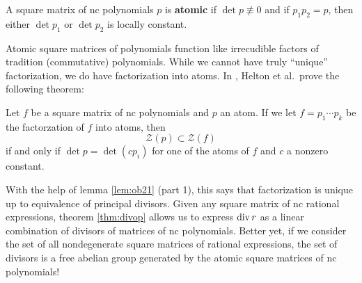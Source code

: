 \begin{definition}[Atomic]%
\label{def:atomic}
  A square matrix of nc polynomials \(p\) is \textbf{atomic} if
  \(\det p \not\equiv 0\) and if \(p_1p_2=p\), then either \(\det p_1\) or
  \(\det p_2\) is locally constant.
\end{definition}

Atomic square matrices of polynomials function like irrecudible factors of
tradition (commutative) polynomials. While we cannot have truly ``unique''
factorization, we do have factorization into atoms. In
\cite{heltonFactorization2019}, Helton et al.\ prove the following theorem:

\begin{theorem}
  Let \(f\) be a square matrix of nc polynomials and \(p\) an atom. If we let
  \(f = p_1 \cdots p_k\) be the factorzation of \(f\) into atoms, then
  \[
    \mathscr{Z}(p) \subset \mathscr{Z}(f)
  \]
  if and only if \(\det p = \det (c p_i)\) for one of the atoms of \(f\) and
  \(c\) a nonzero constant.
\end{theorem}

With the help of lemma \ref{lem:ob21} (part 1), this says that factorization is
unique up to equivalence of principal divisors. Given any square matrix of nc
rational expressions, theorem \ref{thm:divop} allows us to express \(\operatorname{div} r\) as a
linear combination of divisors of matrices of nc polynomials. Better yet, if we consider
the set of all nondegenerate square matrices of rational expressions, the set of
divisors is a free abelian group generated by the atomic square matrices of nc polynomials!

